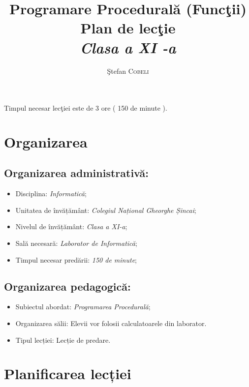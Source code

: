 \documentclass{article}
\title{\textbf{Programare Procedural\u a (Func\c tii) } \\ Plan de lec\c tie \\ \textit{ Clasa a  XI -a} } %
\author{\c Stefan \textsc{Cobeli}} %
\newcommand{\itl}{\textit}
\begin{document}
\maketitle %



Timpul necesar lec\c tiei este de 3 ore ( 150 de minute ).
\section{Organizarea}

	\subsection{Organizarea administrativă:}
		\begin{itemize}[label={-}]
			\item Disciplina: \itl{Informatică};
			\item Unitatea de învățământ: \textit{Colegiul Național Gheorghe Șincai};
			\item Nivelul de învățământ: \itl{Clasa a XI-a};
			\item Sală necesară: \itl{Laborator de Informatică};
			\item Timpul necesar predării: \itl{150 de minute};
				
		\end{itemize}				
		
		
		
	\subsection{Organizarea pedagogică:}
		\begin{itemize}[label={-}]
			\item Subiectul abordat: \itl{Programarea Procedurală};
			\item Organizarea sălii: Elevii vor folosii calculatoarele din laborator. 
			\item Tipul lecției: Lecție de predare.
		\end{itemize}
\newpage
\section{Planificarea lecției}
\end{document}
